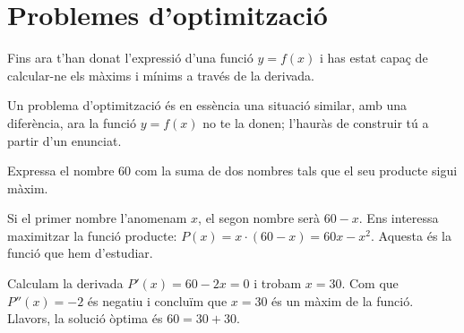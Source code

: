  


\section{Problemes d'optimització}


\begin{theorybox}
	Fins ara t'han donat l'expressió d'una funció $y=f(x)$ i has estat capaç de calcular-ne els màxims i mínims a través de la derivada.\vspace{0.25cm}
	
	Un problema d'optimització és en essència una situació similar, amb una diferència, ara la funció $y=f(x)$ no te la donen; l'hauràs de construir tú a partir d'un enunciat.
\end{theorybox}

\begin{resolt}[E]{
	Expressa el nombre 60 com la suma de dos nombres tals que el seu producte sigui màxim.
}

	Si el primer nombre l'anomenam $x$, el segon nombre serà $60-x$. Ens interessa maximitzar la funció producte:
	$P(x) = x\cdot (60-x) = 60 x - x^2$. Aquesta és la funció que hem d'estudiar.\vspace{0.25cm}
	
	Calculam la derivada $P'(x)= 60 - 2x=0$ i trobam $x=30$. Com que $P''(x)=-2$ és negatiu	
	i concluïm que $x=30$ és un màxim de la funció. Llavors, la solució òptima és $60 = 30 + 30$.
	
\end{resolt}


